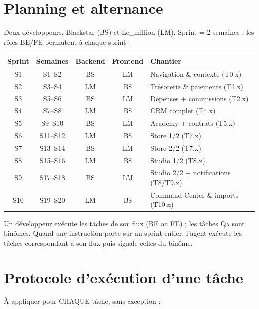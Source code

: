 \documentclass[11pt,a4paper]{article}
\newcommand{\qa}{\textsc{Qa}}
\begin{document}
\section{Planning et alternance}

Deux développeurs, Blackstar (BS) et Le\_million (LM). Sprint = 2 semaines ; les rôles BE/FE permutent à chaque sprint :

\begin{tabularx}{\textwidth}{|c|c|c|c|Y|}
\hline
{}\textbf{Sprint} & \textbf{Semaines} & \textbf{Backend} & \textbf{Frontend} & \textbf{Chantier} \\ \hline
S1 & S1--S2 & BS & LM & Navigation \& contexte (T0.x) \\ \hline
S2 & S3--S4 & LM & BS & Trésorerie \& paiements (T1.x) \\ \hline
S3 & S5--S6 & BS & LM & Dépenses + commissions (T2.x) \\ \hline
S4 & S7--S8 & LM & BS & CRM complet (T4.x) \\ \hline
S5 & S9--S10 & BS & LM & Academy + contrats (T5.x) \\ \hline
S6 & S11--S12 & LM & BS & Store 1/2 (T7.x) \\ \hline
S7 & S13--S14 & BS & LM & Store 2/2 (T7.x) \\ \hline
S8 & S15--S16 & LM & BS & Studio 1/2 (T8.x) \\ \hline
S9 & S17--S18 & BS & LM & Studio 2/2 + notifications (T8/T9.x) \\ \hline
S10 & S19--S20 & LM & BS & Command Center \& imports (T10.x) \\ \hline
\end{tabularx}

Un développeur exécute les tâches de son flux (BE ou FE) ; les tâches \qa{} sont binômes. Quand une instruction porte sur un sprint entier, l'agent exécute les tâches correspondant à son flux puis signale celles du binôme.

\section{Protocole d'exécution d'une tâche}\label{sec:protocole}

À appliquer pour CHAQUE tâche, sans exception :
\end{document}
